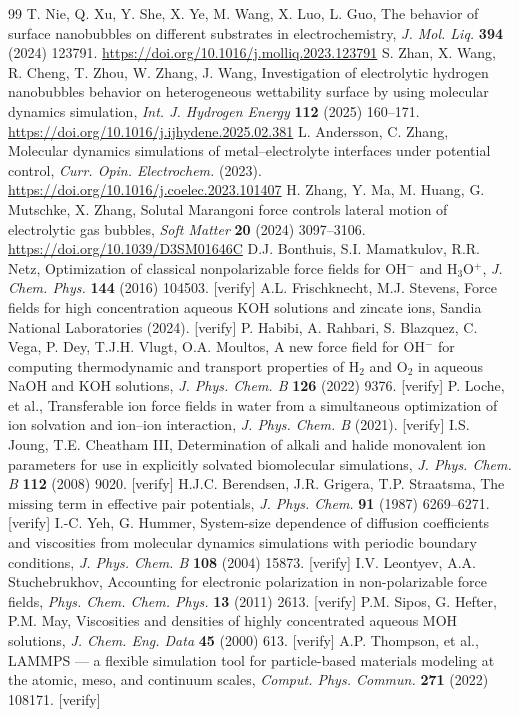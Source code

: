 \documentclass[11pt,a4paper]{article}
\newcommand{\verifyc}{\textcolor{brick}{\footnotesize[verify]}}
\begin{document}
\begin{thebibliography}{99}\small
{} T. Nie, Q. Xu, Y. She, X. Ye, M. Wang, X. Luo, L. Guo, The behavior of surface
nanobubbles on different substrates in electrochemistry, \emph{J. Mol. Liq.} \textbf{394} (2024)
123791. \url{https://doi.org/10.1016/j.molliq.2023.123791}
 S. Zhan, X. Wang, R. Cheng, T. Zhou, W. Zhang, J. Wang, Investigation of
electrolytic hydrogen nanobubbles behavior on heterogeneous wettability surface by using molecular
dynamics simulation, \emph{Int. J. Hydrogen Energy} \textbf{112} (2025) 160--171.
\url{https://doi.org/10.1016/j.ijhydene.2025.02.381}
 L. Andersson, C. Zhang, Molecular dynamics simulations of metal--electrolyte
interfaces under potential control, \emph{Curr. Opin. Electrochem.} (2023).
\url{https://doi.org/10.1016/j.coelec.2023.101407}
 H. Zhang, Y. Ma, M. Huang, G. Mutschke, X. Zhang, Solutal Marangoni force
controls lateral motion of electrolytic gas bubbles, \emph{Soft Matter} \textbf{20} (2024)
3097--3106. \url{https://doi.org/10.1039/D3SM01646C}
 D.J. Bonthuis, S.I. Mamatkulov, R.R. Netz, Optimization of classical
nonpolarizable force fields for OH$^-$ and H$_3$O$^+$, \emph{J. Chem. Phys.} \textbf{144} (2016)
104503. \verifyc
{} A.L. Frischknecht, M.J. Stevens, Force fields for high concentration
aqueous KOH solutions and zincate ions, Sandia National Laboratories (2024). \verifyc
{} P. Habibi, A. Rahbari, S. Blazquez, C. Vega, P. Dey, T.J.H. Vlugt, O.A. Moultos,
A new force field for OH$^-$ for computing thermodynamic and transport properties of H$_2$ and O$_2$
in aqueous NaOH and KOH solutions, \emph{J. Phys. Chem. B} \textbf{126} (2022) 9376. \verifyc
{} P. Loche, et al., Transferable ion force fields in water from a simultaneous
optimization of ion solvation and ion--ion interaction, \emph{J. Phys. Chem. B} (2021). \verifyc
{} I.S. Joung, T.E. Cheatham III, Determination of alkali and halide monovalent ion
parameters for use in explicitly solvated biomolecular simulations, \emph{J. Phys. Chem. B}
\textbf{112} (2008) 9020. \verifyc
{} H.J.C. Berendsen, J.R. Grigera, T.P. Straatsma, The missing term in effective pair
potentials, \emph{J. Phys. Chem.} \textbf{91} (1987) 6269--6271. \verifyc
{} I.-C. Yeh, G. Hummer, System-size dependence of diffusion coefficients and
viscosities from molecular dynamics simulations with periodic boundary conditions,
\emph{J. Phys. Chem. B} \textbf{108} (2004) 15873. \verifyc
{} I.V. Leontyev, A.A. Stuchebrukhov, Accounting for electronic polarization in
non-polarizable force fields, \emph{Phys. Chem. Chem. Phys.} \textbf{13} (2011) 2613. \verifyc
{} P.M. Sipos, G. Hefter, P.M. May, Viscosities and densities of highly concentrated
aqueous MOH solutions, \emph{J. Chem. Eng. Data} \textbf{45} (2000) 613. \verifyc
{} A.P. Thompson, et al., LAMMPS --- a flexible simulation tool for particle-based
materials modeling at the atomic, meso, and continuum scales, \emph{Comput. Phys. Commun.}
\textbf{271} (2022) 108171. \verifyc
\end{thebibliography}
\end{document}
